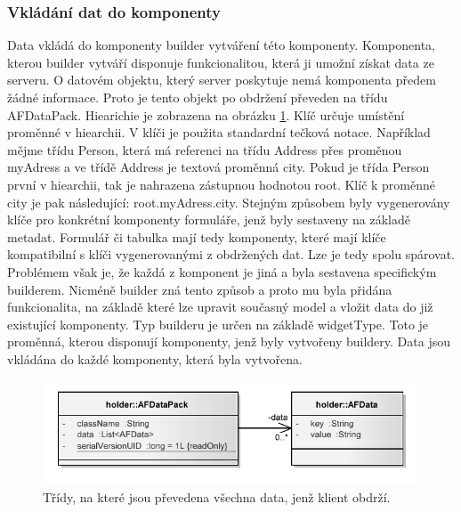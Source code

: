 \subsubsection{Vkládání dat do komponenty}
Data vkládá do komponenty builder vytváření této komponenty. Komponenta, kterou builder vytváří disponuje funkcionalitou, která ji umožní získat data ze serveru. O datovém objektu, který server poskytuje nemá komponenta předem žádné informace. Proto je tento objekt po obdržení převeden na třídu AFDataPack. Hiearichie je zobrazena na obrázku \ref{img:dataPack}. 
Klíč určuje umístění proměnné v hiearchii. V klíči je použita standardní tečková notace. Například mějme třídu Person, která má referenci na třídu Address přes proměnou myAdress a ve třídě Address je textová proměnná city. Pokud je třída Person první v hiearchii, tak je nahrazena zástupnou hodnotou root. Klíč k proměnné city je pak následující: root.myAdress.city. Stejným způsobem byly vygenerovány klíče pro konkrétní komponenty formuláře, jenž byly sestaveny na základě metadat. Formulář či tabulka mají tedy komponenty, které mají klíče kompatibilní s klíči vygenerovanými z obdržených dat. Lze je tedy spolu spárovat. Problémem však je, že každá z komponent je jiná a byla sestavena specifickým builderem. Nicméně builder zná tento způsob a proto mu byla přidána funkcionalita, na základě které lze upravit současný model a vložit data do již existující komponenty. Typ builderu je určen na základě widgetType. Toto je proměnná, kterou disponují komponenty, jenž byly vytvořeny buildery. Data jsou vkládána do každé komponenty, která byla vytvořena.

\begin{figure}[h!]
\includegraphics{images/dataPack}
\caption{Třídy, na které jsou převedena všechna data, jenž klient obdrží.}
\label{img:dataPack}
\end{figure}

